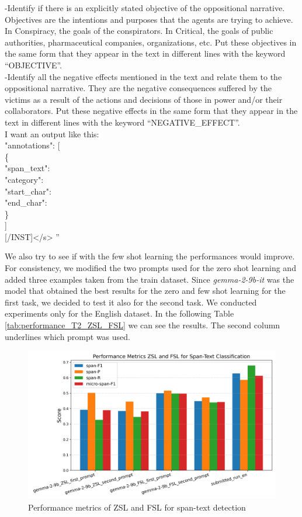 \documentclass{Configuration_Files/PoliMi3i_thesis}
\begin{document}
\begin{flushleft}
{-Identify if there is an explicitly stated objective of the oppositional narrative. Objectives are the intentions and purposes that the agents are trying to achieve. In Conspiracy, the goals of the conspirators. In Critical, the goals of public authorities, pharmaceutical companies, organizations, etc. Put these objectives in the same form that they appear in the text in different lines with the keyword “OBJECTIVE”.\\
-Identify all the negative effects mentioned in the text and relate them to the oppositional narrative. They are the negative consequences suffered by the victims as a result of the actions and decisions of those in power and/or their collaborators. Put these negative effects in the same form that they appear in the text in different lines with the keyword “NEGATIVE\_EFFECT”.\\
I want an output like this:\\
"annotations": [\\
      \{ \\
         "span\_text":\\
         "category":\\
         "start\_char":\\
         "end\_char":\\ 
        \}\\ ]\\
\mbox{[/INST]</s>} \textquotedblright
}
\end{flushleft}

We also try to see if with the few shot learning the performances would improve. For consistency, we modified the two prompts used for the zero shot learning and added three examples taken from the train dataset. Since \textit{gemma-2-9b-it} was the model that obtained the best results for the zero and few shot learning for the first task, we decided to test it also for the second task. We conducted experiments only for the English dataset. In the following Table \ref{tab:performance_T2_ZSL_FSL} we can see the results. The second column underlines which prompt was used.

\begin{figure}[H]
 \centering
 \includegraphics[width=0.95\linewidth, height=0.42\textheight]{Images/t2_zsl_fsl.png}
 \caption{Performance metrics of ZSL and FSL for span-text detection}
 \label{fig:t2_zsl_fsl}
\end{figure}
\FloatBarrier
\end{document}
